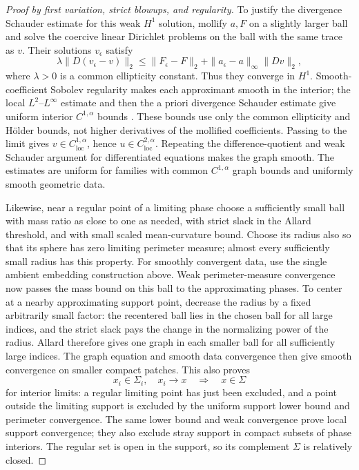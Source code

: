 \documentclass[11pt]{article}
\numberwithin{equation}{section}
\theoremstyle{definition}
\theoremstyle{remark}
\begin{document}
\begin{proof}[Proof by first variation, strict blowups, and regularity]
To justify the divergence Schauder estimate for this weak $H^1$
solution, mollify $a,F$ on a slightly larger ball and solve the
coercive linear Dirichlet problems on the ball with the same trace as
$v$.  Their solutions $v_\epsilon$ satisfy
\[
 \lambda\|D(v_\epsilon-v)\|_2
 \le \|F_\epsilon-F\|_2
       +\|a_\epsilon-a\|_\infty\|Dv\|_2,
\]
where $\lambda>0$ is a common ellipticity constant.  Thus they converge
in $H^1$.  Smooth-coefficient Sobolev regularity makes each approximant
smooth in the interior; the local $L^2$--$L^\infty$ estimate and then
the a priori divergence Schauder estimate give uniform interior
$C^{1,\alpha}$ bounds
\citep[Lecture~6, Theorem~1 and Corollary~1; Lecture~18, Theorem~2;
Lecture~12, Theorem~1]{simonPDE}.
These bounds use only the common ellipticity and H\"older bounds,
not higher derivatives of the mollified coefficients.  Passing to
the limit gives $v\in C^{1,\alpha}_{\mathrm{loc}}$, hence
$u\in C^{2,\alpha}_{\mathrm{loc}}$.  Repeating the difference-quotient
and weak Schauder argument for differentiated equations makes the
graph smooth.  The estimates are uniform for families with common
$C^{1,\alpha}$ graph bounds and uniformly smooth geometric data.

Likewise, near a regular point of a limiting phase choose a sufficiently
small ball with mass ratio as close to one as needed, with strict slack
in the Allard threshold, and with small scaled mean-curvature bound.
Choose its radius also so that its sphere has zero limiting perimeter
measure; almost every sufficiently small radius has this property.
For smoothly convergent data, use the single ambient embedding
construction above.  Weak perimeter-measure convergence now passes the
mass bound on this ball to the approximating phases.  To center at a
nearby approximating support point, decrease the radius by a fixed
arbitrarily small factor: the recentered ball lies in the chosen ball
for all large indices, and the strict slack pays the change in the
normalizing power of the radius.  Allard therefore gives one graph in
each smaller ball for all sufficiently large indices.  The graph equation and smooth data convergence then give
smooth convergence on smaller compact patches.  This also proves
\[
 x_i\in\Sigma_i,\quad x_i\longrightarrow x
                    \quad\Longrightarrow\quad x\in\Sigma
\]
for interior limits: a regular limiting point has just been excluded,
and a point outside the limiting support is excluded by the uniform
support lower bound and perimeter convergence.  The same lower bound
and weak convergence prove local support convergence; they also exclude
stray support in compact subsets of phase interiors.  The regular set
is open in the support, so its complement $\Sigma$ is relatively closed.


\end{proof}
\end{document}
